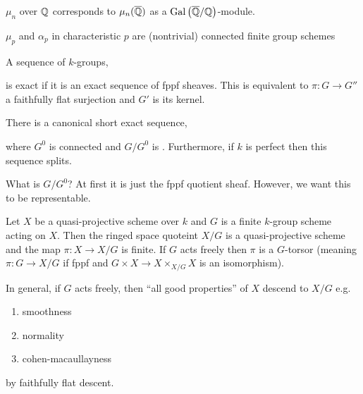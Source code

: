 \documentclass[12pt]{article}
\begin{document}
\begin{example}
$\mu_n$ over $\mathbb{Q}$ corresponds to $\mu_n(\overline{\mathbb{Q}})$ as a $\mathrm{Gal}\left( \overline{\mathbb{Q}}/\mathbb{Q} \right)$-module.
\end{example}

\begin{example}
$\mu_p$ and $\alpha_p$ in characteristic $p$ are (nontrivial) connected finite group schemes
\end{example}

\begin{rmk}
A sequence of $k$-groups,
\begin{center}
\end{center}
is exact if it is an exact sequence of fppf sheaves. This is equivalent to $\pi : G \to G''$ a faithfully flat surjection and $G'$ is its kernel. 
\end{rmk}

\begin{thm}
There is a canonical short exact sequence,
\begin{center}
\end{center}
where $G^0$ is connected and $G / G^0$ is \etale. Furthermore, if $k$ is perfect then this sequence splits.
\end{thm}

\begin{rmk}
What is $G / G^0$? At first it is just the fppf quotient sheaf. However, we want this to be representable.
\end{rmk}

\begin{thm}
Let $X$ be a quasi-projective scheme over $k$ and $G$ is a finite $k$-group scheme acting on $X$. Then the ringed space quoteint $X / G$ is a quasi-projective scheme and the map $\pi : X \to X / G$ is finite. If $G$ acts freely then $\pi$ is a $G$-torsor (meaning $\pi : G \to X / G$ if fppf and $G \times X \to X \times_{X / G} X$ is an isomorphism). 
\end{thm}

\begin{rmk}
In general, if $G$ acts freely, then ``all good properties'' of $X$ descend to $X/G$ e.g.
\begin{enumerate}
\item smoothness
\item normality
\item cohen-macaullayness
\end{enumerate}
by faithfully flat descent. 
\end{rmk}
\end{document}
